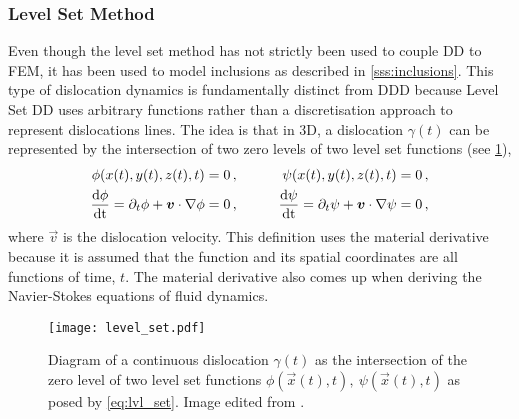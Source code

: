 \subsubsection{Level Set Method}
\label{sss:lvl_set}
%
Even though the level set method has not strictly been used to couple DD to FEM, it has been used to model inclusions \cite{ddd_inclusion_as_force} as described in \cref{sss:inclusions}. This type of dislocation dynamics is fundamentally distinct from DDD because Level Set DD uses arbitrary functions rather than a discretisation approach to represent dislocations lines. The idea is that in 3D, a dislocation $ \gamma(t) $ can be represented by the intersection of two zero levels of two level set functions (see \cref{fig:lvl_set_dd}),
\begin{subequations}\label{eq:lvl_set}
	\begin{align}
		\phi(x(t),y(t),z(t),t)                                                          & = 0\,, & \qquad
		\psi(x(t),y(t),z(t),t)                                                          & = 0\,,          \\
		\dfrac{\rvar{d} \phi}{\rvar{dt}} = \partial_{t}\phi + \vec{v} \cdot \nabla \phi & = 0\,, & \qquad
		\dfrac{\rvar{d} \psi}{\rvar{dt}} = \partial_{t}\psi + \vec{v} \cdot \nabla \psi & = 0\,,
	\end{align}
\end{subequations}
where $ \vec{v} $ is the dislocation velocity. This definition uses the material derivative because it is assumed that the function and its spatial coordinates are all functions of time, $ t $. The material derivative also comes up when deriving the Navier-Stokes equations of fluid dynamics.
\begin{figure}[t]
	\centering
	\texttt{[image: level\_set.pdf]}
	\caption[Level set Dislocation Dynamics.]{Diagram of a continuous dislocation $ \gamma(t) $ as the intersection of the zero level of two level set functions $ \phi(\vec{x}(t),t),~\psi(\vec{x}(t),t) $ as posed by \cref{eq:lvl_set}. Image edited from \cite{lvl_set_dd}.}
	\label{fig:lvl_set_dd}
\end{figure}

